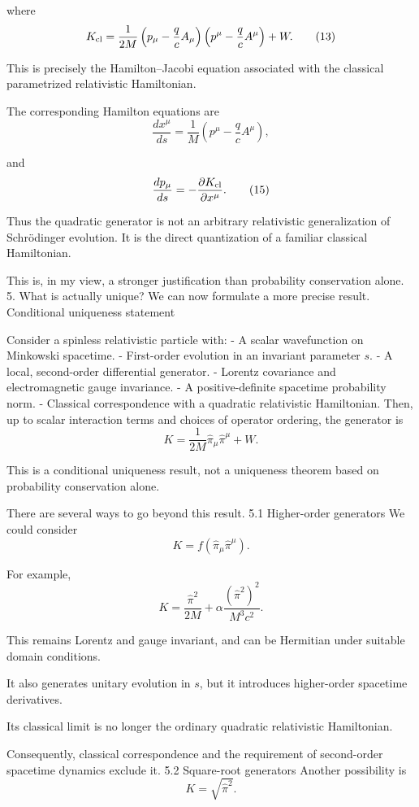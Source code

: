where
\[
K_{\rm cl}
=
\frac{1}{2M}
\left(p_\mu-\frac qc A_\mu\right)
\left(p^\mu-\frac qc A^\mu\right)
+W.
\tag{13}
\]

This is precisely the Hamilton–Jacobi equation associated with the classical parametrized relativistic Hamiltonian.

The corresponding Hamilton equations are
\[
\frac{dx^\mu}{ds}
=
\frac{1}{M}
\left(p^\mu-\frac qc A^\mu\right),
\tag{14}
\]

and
\[
\frac{dp_\mu}{ds}
=
-\frac{\partial K_{\rm cl}}{\partial x^\mu}.
\tag{15}
\]

Thus the quadratic generator is not an arbitrary relativistic generalization of Schrödinger evolution. It is the direct quantization of a familiar classical Hamiltonian.

This is, in my view, a stronger justification than probability conservation alone.
5. What is actually unique?
We can now formulate a more precise result.
Conditional uniqueness statement

Consider a spinless relativistic particle with:
- A scalar wavefunction on Minkowski spacetime.
- First-order evolution in an invariant parameter \(s\).
- A local, second-order differential generator.
- Lorentz covariance and electromagnetic gauge invariance.
- A positive-definite spacetime probability norm.
- Classical correspondence with a quadratic relativistic Hamiltonian.
Then, up to scalar interaction terms and choices of operator ordering, the generator is
\[
K=\frac{1}{2M}\hat\pi_\mu\hat\pi^\mu+W.
\]

This is a conditional uniqueness result, not a uniqueness theorem based on probability conservation alone.

There are several ways to go beyond this result.
5.1 Higher-order generators
We could consider
\[
K=f(\hat\pi_\mu\hat\pi^\mu).
\]

For example,
\[
K=
\frac{\hat\pi^2}{2M}
+\alpha\frac{(\hat\pi^2)^2}{M^3c^2}.
\]

This remains Lorentz and gauge invariant, and can be Hermitian under suitable domain conditions.

It also generates unitary evolution in \(s\), but it introduces higher-order spacetime derivatives.

Its classical limit is no longer the ordinary quadratic relativistic Hamiltonian.

Consequently, classical correspondence and the requirement of second-order spacetime dynamics exclude it.
5.2 Square-root generators
Another possibility is
\[
K=\sqrt{\hat\pi^2}.
\]

